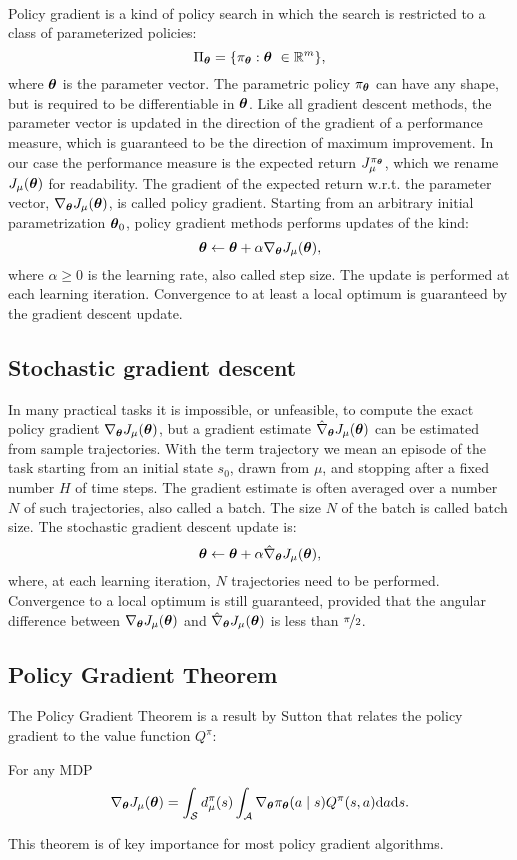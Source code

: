 \paragraph{} %
Policy gradient is a kind of policy search in which the search is restricted to a class of parameterized policies:  
\[
	\Pi_{\boldsymbol{\theta}} = \{\pi_{\boldsymbol{\theta}}:\boldsymbol{\theta}\ \in \mathbb{R}^m\},
\]
where $\boldsymbol{\theta}$ is the parameter vector. The parametric policy $\pi_{\boldsymbol{\theta}}$ can have any shape, but is required to be differentiable in $\boldsymbol{\theta}$. Like all gradient descent methods, the parameter vector is updated in the direction of the gradient of a performance measure, which is guaranteed to be the direction of maximum improvement. In our case the performance measure is the expected return $J_{\mu}^{\pi_{\boldsymbol{\theta}}}$, which we rename $J_{\mu}(\boldsymbol{\theta})$ for readability. The gradient of the expected return w.r.t. the parameter vector, $\nabla_{\boldsymbol{\theta}}J_\mu(\boldsymbol{\theta})$, is called policy gradient. Starting from an arbitrary initial parametrization $\boldsymbol{\theta}_0$, policy gradient methods performs updates of the kind: 
\[
	\boldsymbol{\theta} \gets \boldsymbol{\theta} + \alpha\nabla_{\boldsymbol{\theta}}J_\mu(\boldsymbol{\theta}),
\]
where $\alpha \geq 0$ is the learning rate, also called step size. The update is performed at each learning iteration.
Convergence to at least a local optimum is guaranteed by the gradient descent update.

\subsection{Stochastic gradient descent}
In many practical tasks it is impossible, or unfeasible, to compute the exact policy gradient $\nabla_{\boldsymbol{\theta}}J_\mu(\boldsymbol{\theta})$, but a gradient estimate $\hat{\nabla}_{\boldsymbol{\theta}}J_{\mu}(\boldsymbol{\theta})$ can be estimated from sample trajectories. With the term trajectory we mean an episode of the task starting from an initial state $s_0$, drawn from $\mu$, and stopping after a fixed number $H$ of time steps. The gradient estimate is often averaged over a number $N$ of such trajectories, also called a batch. The size $N$ of the batch is called batch size. The stochastic gradient descent update is:
\[
	\boldsymbol{\theta} \gets \boldsymbol{\theta} + \alpha\hat{\nabla}_{\boldsymbol{\theta}}J_{\mu}(\boldsymbol{\theta}),
\]
where, at each learning iteration, $N$ trajectories need to be performed.
Convergence to a local optimum is still guaranteed, provided that the angular difference between $\nabla_{\boldsymbol{\theta}}J_\mu(\boldsymbol{\theta})$ and $\hat{\nabla}_{\boldsymbol{\theta}}J_{\mu}(\boldsymbol{\theta})$ is less than $\nicefrac{\pi}{2}$.

\subsection{Policy Gradient Theorem}
The Policy Gradient Theorem is a result by Sutton \cite{Sutton1999a} that relates the policy gradient to the value function $Q^\pi$:
\begin{theorem}
For any \ac{MDP}
\[
	\nabla_{\boldsymbol{\theta}}J_\mu(\boldsymbol{\theta}) = \int_{\mathcal{S}}d_{\mu}^{\pi}(s)
		\int_{\mathcal{A}} \nabla_{\boldsymbol{\theta}}\pi_{\boldsymbol{\theta}}(a \mid s)Q^{\pi}(s,a)\mathrm{d}a\mathrm{d}s.
\]
\end{theorem}
This theorem is of key importance for most policy gradient algorithms.
